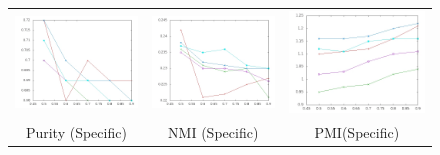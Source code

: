 \documentclass[10pt,a5paper,twoside]{article}
\begin{document}
\begin{figure}[t!]
\begin{center}
{\begin{tabular}{ccc}
		\includegraphics[width=140pt]{Figs/2-1.jpg} & 
		\includegraphics[width=140pt]{Figs/2-2.jpg} & 
		 \includegraphics[width=140pt]{Figs/2-3.jpg} \\

		{\footnotesize Purity (Specific)} & {\footnotesize NMI (Specific)} & 
		{\footnotesize PMI(Specific)}\\



\end{tabular}}
\end{center}
\end{figure}
\end{document}
